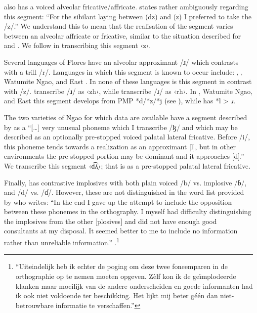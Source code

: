  also has a voiced alveolar fricative/affricate.
\citet[vi]{Verheijen1977} states rather ambiguously regarding this
segment: “For the sibilant laying between (dz)
and (z) I preferred to take the /z/.” We understand this to mean
that the realisation of the  segment varies between an
alveolar affricate or fricative,
similar to the situation described for  and .
We follow \citet{Verheijen1977} in transcribing this segment ‹z›.

Several languages of Flores have an alveolar approximant /ɹ/
which contrasts with a trill /r/.
Languages in which this segment is known to occur include: ,
, Watumite Nga{\Q}o, and East .
In none of these languages is this segment in contrast with /z/.
\citet{ArkaEtAl2007} transcribe  /ɹ/ as ‹zh›, while \citet{AokiNakagawa1993}
transcribe  /ɹ/ as ‹rh›.
In , Watumite Nga{\Q}o,
and East  this segment develops from PMP *d/*z/*j (see ),
while  has *l > \it{ɹ}.

The two varieties of Nga{\Q}o for which data are available have
a segment described by \citet[78]{Elias2018} as a “[{\ldots}]
very unusual phoneme which I transcribe /ɮ/
and which may be described as an optionally pre-stopped voiced palatal lateral fricative.
Before /i/, this phoneme tends towards a realization as an approximant
[l], but in other environments the pre-stopped portion may be dominant
and it approaches [d].” We transcribe this segment ‹d͡ʎ̝›;
that is as a pre-stopped palatal lateral fricative.

Finally,  has contrastive implosives with both plain
voiced /b/ vs. implosive /ɓ/, and /d/ vs. /ɗ/.
However, these are not distinguished in the word list provided
by \citet{Verheijen1987} who writes: “In the end I gave up the
attempt to include the opposition between these phonemes in the orthography.
I myself had difficulty distinguishing the implosives from the
other [plosives] and did not have enough good consultants at my disposal.
It seemed better to me to include no information rather than
unreliable information.” \citep[27]{Verheijen1982}.\footnote{
		“Uiteindelijk heb ik echter de poging om deze twee foneemparen in de orthographie
		op te nemen moeten opgeven.
		Zèlf kon ik de geïmplodeerde klanken maar moeilijk van de andere
		onderscheiden en goede informanten had ik ook niet voldoende ter beschikking.
		Het lijkt mij beter géén dan niet-betrouwbare informatie te verschaffen.”}